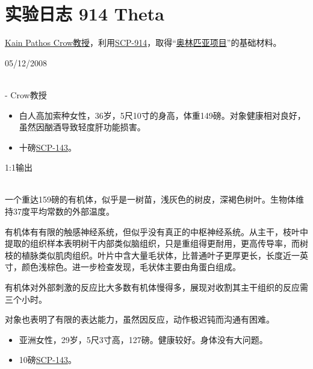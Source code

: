 \chapter{实验日志 914 Theta}

\label{chap:DOC-experiment-log-914-theta}

\hyperref[chap:]{Kain Pathos Crow教授}，利用\hyperref[chap:SCP-914]{SCP-914}，取得“\hyperref[chap:]{奥林匹亚项目}”的基础材料。

05\slash 12\slash 2008

\\
 - Crow教授



\begin{itemize}
\item 白人高加索种女性，36岁，5尺10寸的身高，体重149磅。对象健康相对良好，虽然因酗酒导致轻度肝功能损害。
\item 十磅\hyperref[chap:SCP-143]{SCP-143}。
\end{itemize}

1:1输出

\\
一个重达159磅的有机体，似乎是一树苗，浅灰色的树皮，深褐色树叶。生物体维持37度平均常数的外部温度。

有机体有有限的触感神经系统，但似乎没有真正的中枢神经系统。从主干，枝叶中提取的组织样本表明树干内部类似脑组织，只是重组得更耐用，更高传导率，而树枝的植脉类似肌肉组织。叶片中含大量毛状体，比普通叶子更厚更长，长度近一英寸，颜色浅棕色。进一步检查发现，毛状体主要由角蛋白组成。

有机体对外部刺激的反应比大多数有机体慢得多，展现对收割其主干组织的反应需三个小时。

对象也表明了有限的表达能力，虽然因反应，动作极迟钝而沟通有困难。




\begin{itemize}
\item 亚洲女性，29岁，5尺3寸高，127磅。健康较好。身体没有大问题。
\item 10磅\hyperref[chap:SCP-143]{SCP-143}。
\end{itemize}

